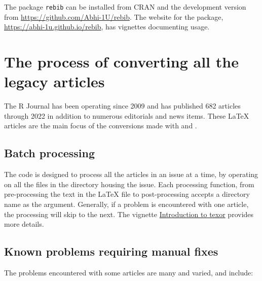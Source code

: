 The package \texttt{rebib} can be installed from CRAN and the development version from \url{https://github.com/Abhi-1U/rebib}. The website for the package, \url{https://abhi-1u.github.io/rebib}, has vignettes documenting usage.

\section{The process of converting all the legacy articles}\label{the-process-of-converting-all-the-legacy-articles}

The R Journal has been operating since 2009 and has published 682 articles through 2022 in addition to numerous editorials and news items. These LaTeX articles are the main focus of the conversions made with  and .

\subsection{Batch processing}\label{batch-processing}

The code is designed to process all the articles in an issue at a time, by operating on all the files in the directory housing the issue. Each processing function, from pre-processing the text in the LaTeX file to post-processing accepts a directory name as the argument. Generally, if a problem is encountered with one article, the processing will skip to the next. The vignette \href{https://abhi-1u.github.io/texor/articles/introduction-to-texor.html}{Introduction to texor} provides more details.

\subsection{Known problems requiring manual fixes}\label{known-problems-requiring-manual-fixes}

The problems encountered with some articles are many and varied, and include:


